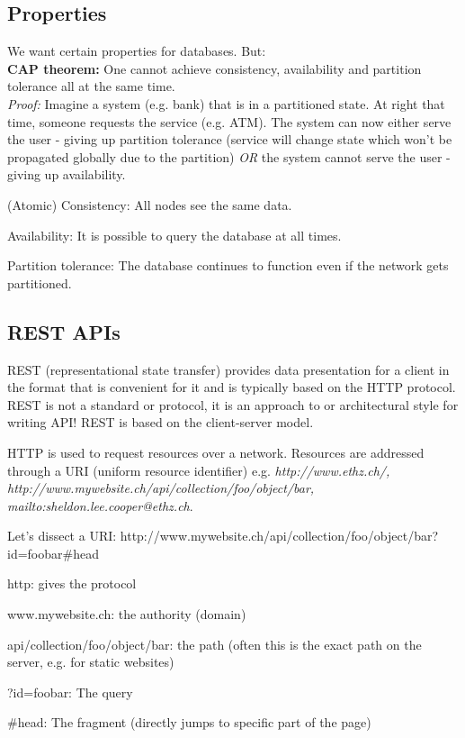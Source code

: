 \documentclass[11pt,oneside,a4paper]{article}
\begin{document}
\subsection{Properties}

We want certain properties for databases. But:\\
\textbf{CAP theorem:} One cannot achieve consistency, availability and partition tolerance all at the same time.\\
\textit{Proof:} Imagine a system (e.g. bank) that is in a partitioned state. At right that time, someone requests the service (e.g. ATM). The system can now either serve the user - giving up partition tolerance (service will change state which won't be propagated globally due to the partition) \textit{OR} the system cannot serve the user - giving up availability.

\begin{compactitem}
	\item (Atomic) Consistency:	All nodes see the same data.
	\item Availability:	It is possible to query the database at all times.
	\item Partition tolerance: The database continues to function even if the network gets partitioned.\\
\end{compactitem}

\subsection{REST APIs}

REST (representational state transfer) provides data presentation for a client in the format that is convenient for it and is typically based on the HTTP protocol. REST is not a standard or protocol, it is an approach to or architectural style for writing API! REST is based on the client-server model.

HTTP is used to request resources over a network. Resources are addressed through a URI (uniform resource identifier) e.g. \textit{http://www.ethz.ch/, http://www.mywebsite.ch/api/collection/foo/object/bar, mailto:sheldon.lee.cooper@ethz.ch}.

Let's dissect a URI: http://www.mywebsite.ch/api/collection/foo/object/bar?id=foobar\#head

\begin{compactitem}
	\item http: gives the protocol
	\item www.mywebsite.ch: the authority (domain)
	\item api/collection/foo/object/bar: the path (often this is the exact path on the server, e.g. for static websites)
	\item ?id=foobar: The query
	\item \#head: The fragment (directly jumps to specific part of the page)
\end{compactitem}
\end{document}
